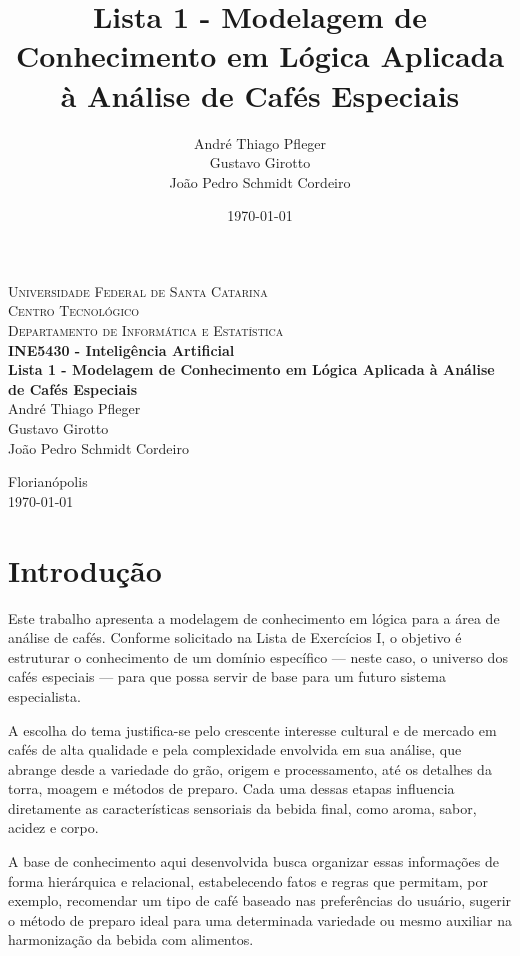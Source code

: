 \documentclass[a4paper,12pt]{article}
\title{Lista 1 - Modelagem de Conhecimento em Lógica Aplicada à Análise de Cafés Especiais}
\author{André Thiago Pfleger \\  Gustavo Girotto \\ João Pedro Schmidt Cordeiro}
\date{\today}
\begin{document}
\begin{titlepage}
   \begin{center}
      \textsc{Universidade Federal de Santa Catarina} \\
      \textsc{Centro Tecnológico} \\
      \textsc{Departamento de Informática e Estatística} \\[4cm]

      \textbf{\Large{INE5430 - Inteligência Artificial}} \\[2cm]

      \textbf{\huge{Lista 1 - Modelagem de Conhecimento em Lógica Aplicada à Análise de Cafés Especiais}} \\[3cm]

      André Thiago Pfleger \\
      Gustavo Girotto \\
      João Pedro Schmidt Cordeiro \\
      
      \vfill
      
      {Florianópolis} \\
      {\today}
   \end{center}
\end{titlepage}

\section{Introdução}

Este trabalho apresenta a modelagem de conhecimento em lógica para a área de análise de cafés. Conforme solicitado na Lista de Exercícios I, o objetivo é estruturar o conhecimento de um domínio específico — neste caso, o universo dos cafés especiais — para que possa servir de base para um futuro sistema especialista.

A escolha do tema justifica-se pelo crescente interesse cultural e de mercado em cafés de alta qualidade e pela complexidade envolvida em sua análise, que abrange desde a variedade do grão, origem e processamento, até os detalhes da torra, moagem e métodos de preparo. Cada uma dessas etapas influencia diretamente as características sensoriais da bebida final, como aroma, sabor, acidez e corpo.

A base de conhecimento aqui desenvolvida busca organizar essas informações de forma hierárquica e relacional, estabelecendo fatos e regras que permitam, por exemplo, recomendar um tipo de café baseado nas preferências do usuário, sugerir o método de preparo ideal para uma determinada variedade ou mesmo auxiliar na harmonização da bebida com alimentos.
\end{document}
